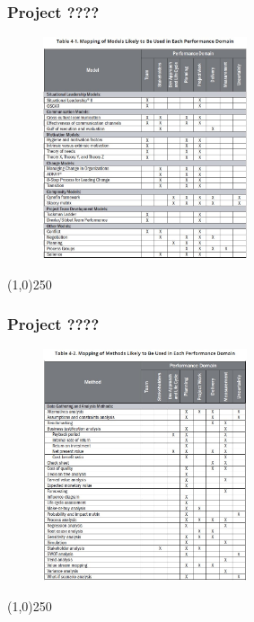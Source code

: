 \begin{frame}
\frametitle{Project ????}
 \begin{figure}
    \centering
        \includegraphics[width = 6cm]{../images/guide/Table4-1.jpg}
    \label{guideTable:4-1}
 \end{figure}
\end{frame}
\begin{center}\line(1,0){250}\end{center}

\begin{frame}
\frametitle{Project ????}
 \begin{figure}
    \centering
        \includegraphics[width = 6cm]{../images/guide/Table4-2a.jpg}
    \label{guideTable:4-2a}
 \end{figure}
\end{frame}
\begin{center}\line(1,0){250}\end{center}


